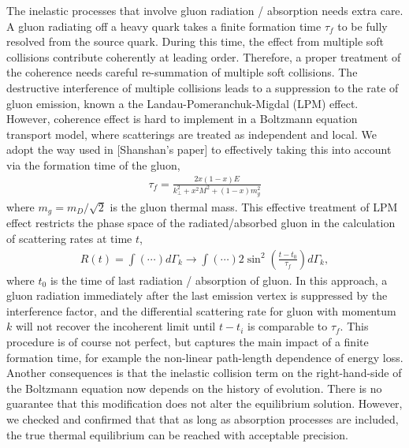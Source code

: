 \documentclass[aps, prc, reprint, amsmath, groupedaddress, nofootinbib]{revtex4-1}
\begin{document}
The inelastic processes that involve gluon radiation / absorption needs extra care. 
A gluon radiating off a heavy quark takes a finite formation time $\tau_f$ to be fully resolved from the source quark. During this time, the effect from multiple soft collisions contribute coherently at leading order.
Therefore, a proper treatment of the coherence needs careful re-summation of multiple soft collisions.
The destructive interference of multiple collisions leads to a suppression to the rate of gluon emission, known a the Landau-Pomeranchuk-Migdal (LPM) effect.
However, coherence effect is hard to implement in a Boltzmann equation transport model, where scatterings are treated as independent and local.
We adopt the way used in [Shanshan's paper] to effectively taking this into account via the formation time of the gluon,
\begin{eqnarray}
\tau_f = \frac{2x(1-x)E}{k_\perp^2 + x^2M^2 + (1-x)m_g^2}
\end{eqnarray}
where $m_g = m_D/\sqrt{2}$ is the gluon thermal mass.
This effective treatment of LPM effect restricts the phase space of the radiated/absorbed gluon in the calculation of scattering rates at time $t$,
\begin{eqnarray}
R(t) = \int (\cdots)d\Gamma_k \rightarrow \int (\cdots) 2\sin^2\left(\frac{t-t_0}{\tau_f}\right)d\Gamma_k,
\end{eqnarray}
where $t_0$ is the time of last radiation / absorption of gluon.
In this approach, a gluon radiation immediately after the last emission vertex is suppressed by the interference factor, and the differential scattering rate for gluon with momentum $k$ will not recover the incoherent limit until $t-t_i$ is comparable to $\tau_f$.
This procedure is of course not perfect, but captures the main impact of a finite formation time, for example the non-linear path-length dependence of energy loss.
Another consequences is that the inelastic collision term on the right-hand-side of the Boltzmann equation now depends on the history of evolution.
There is no guarantee that this modification does not alter the equilibrium solution.
However, we checked and confirmed that that as long as absorption processes are included, the true thermal equilibrium can be reached with acceptable precision.
\end{document}

